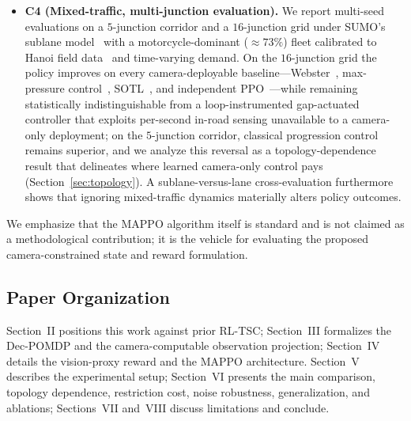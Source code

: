 \begin{itemize}
  \item \textbf{C4 (Mixed-traffic, multi-junction evaluation).} We report multi-seed evaluations on a $5$-junction corridor and a $16$-junction grid under SUMO's sublane model~\cite{lopez2018_sumo} with a motorcycle-dominant
  ($\approx 73\%$) fleet calibrated to Hanoi field data~\cite{ngoc2021_fivecities,cao_sano_hanoi} and time-varying demand. On the $16$-junction grid the policy improves on every camera-deployable baseline---Webster~\cite{webster1958}, max-pressure control~\cite{varaiya2013_maxpressure}, SOTL~\cite{cools2013_sotl}, and independent PPO~\cite{dewitt2020_ippo}---while remaining statistically indistinguishable from a loop-instrumented gap-actuated controller that exploits per-second in-road sensing unavailable to a camera-only deployment; on the $5$-junction corridor, classical progression control remains superior, and we analyze this reversal as a topology-dependence result that delineates where learned camera-only control pays (Section~\ref{sec:topology}). A sublane-versus-lane cross-evaluation furthermore shows that ignoring mixed-traffic dynamics materially alters policy outcomes.
\end{itemize}
We emphasize that the MAPPO algorithm itself is standard and is not claimed as a methodological contribution; it is the vehicle for evaluating the proposed camera-constrained state and reward formulation.

\subsection{Paper Organization}
Section~II positions this work against prior RL-TSC; Section~III formalizes the Dec-POMDP and the camera-computable observation projection; Section~IV details the vision-proxy reward and the MAPPO architecture. Section~V describes the experimental setup; Section~VI presents the main comparison, topology dependence, restriction cost, noise robustness, generalization, and ablations; Sections~VII and~VIII discuss limitations and conclude.